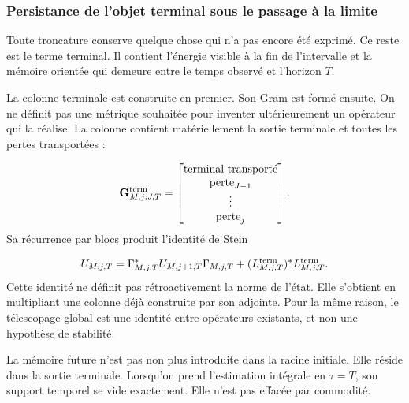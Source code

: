 \subsubsection{Persistance de l’objet terminal sous le passage à la limite}
Toute troncature conserve quelque chose qui n’a pas encore été exprimé. Ce reste est le terme terminal. Il contient l’énergie visible à la fin de l’intervalle et la mémoire orientée qui demeure entre le temps observé et l’horizon \(T\).\par
La colonne terminale est construite en premier. Son Gram est formé ensuite. On ne définit pas une métrique souhaitée pour inventer ultérieurement un opérateur qui la réalise. La colonne contient matériellement la sortie terminale et toutes les pertes transportées :\par
\[
\mathbf G_{M,j;J,T}^{\rm term}
=
\begin{bmatrix}
\text{terminal transporté}\\
\text{perte}_{J-1}\\
\vdots\\
\text{perte}_{j}
\end{bmatrix}.
\]
Sa récurrence par blocs produit l’identité de Stein\par
\[
U_{M,j,T}
=
\Gamma_{M,j,T}^{*}
U_{M,j+1,T}
\Gamma_{M,j,T}
+
(L_{M,j,T}^{\rm term})^{*}
L_{M,j,T}^{\rm term}.
\]
Cette identité ne définit pas rétroactivement la norme de l’état. Elle s’obtient en multipliant une colonne déjà construite par son adjointe. Pour la même raison, le télescopage global est une identité entre opérateurs existants, et non une hypothèse de stabilité.\par
La mémoire future n’est pas non plus introduite dans la racine initiale. Elle réside dans la sortie terminale. Lorsqu’on prend l’estimation intégrale en \(\tau=T\), son support temporel se vide exactement. Elle n’est pas effacée par commodité.\par
{}
